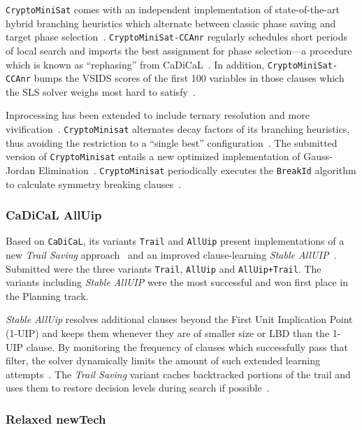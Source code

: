 \documentclass{elsarticle}
\newcommand{\solver}[1]{\texttt{#1}}
\begin{document}
\solver{CryptoMiniSat} comes with an independent implementation of state-of-the-art hybrid branching heuristics which alternate between classic phase saving and target phase selection~\cite{Biere:SC2019}.
\solver{CryptoMiniSat-CCAnr} regularly schedules short periods of local search and imports the best assignment for phase selection---a procedure which is known as ``rephasing'' from CaDiCaL~\cite{Biere:SC2019}.
In addition, \solver{CryptoMiniSat-CCAnr} bumps the VSIDS scores of the first 100 variables in those clauses which the SLS solver weighs most hard to satisfy~\cite{Soos:SC2020}.

Inprocessing has been extended to include ternary resolution and more vivification~\cite{ChuMinLi:2020:Vivification}. 
\solver{CryptoMinisat} alternates decay factors of its branching heuristics, thus avoiding the restriction to a ``single best'' configuration~\cite{Soos:SC2020}. 
The submitted version of \solver{CryptoMinisat} entails a new optimized implementation of Gauss-Jordan Elimination~\cite{Soos:2020:CNFXOR}. 
\solver{CryptoMinisat} periodically executes the \solver{BreakId} algorithm to  calculate symmetry breaking clauses~\cite{Devriendt:2016:BreakId}.


\subsubsection{CaDiCaL AllUip}

Based on \solver{CaDiCaL}, its variants \solver{Trail} and \solver{AllUip} present implementations of a new \emph{Trail Saving} approach~\cite{Hickey:2020:TrailSaving} 
and an improved clause-learning \emph{Stable AllUIP}~\cite{Bacchus:SC2020}. 
Submitted were the three variants \solver{Trail}, \solver{AllUip} and \solver{AllUip+Trail}. 
The variants including \emph{Stable AllUIP} were the most successful and won  first place in the Planning track. 

\emph{Stable AllUip} resolves additional clauses beyond the First Unit Implication Point (1-UIP) and keeps them whenever they are of smaller size or LBD than the 1-UIP clause. 
By monitoring the frequency of clauses which successfully pass that filter, the solver dynamically limits the amount of such extended learning attempts~\cite{Zhang:2001:ClauseLearning,Bacchus:SC2020}.
The \emph{Trail Saving} variant caches backtracked portions of the trail and uses them to restore decision levels during search if possible~\cite{Hickey:2020:TrailSaving}. 


\subsubsection{Relaxed newTech}
\end{document}
